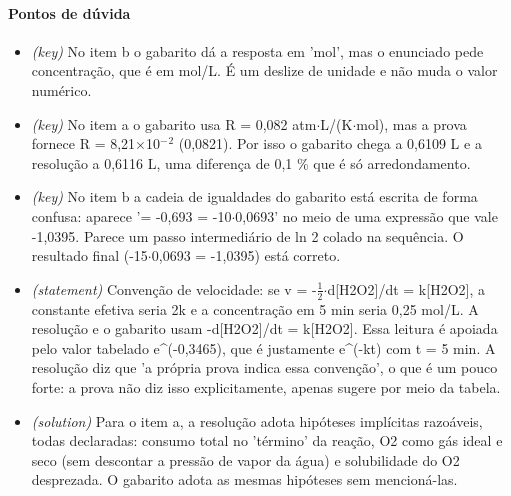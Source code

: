 \documentclass{article}%
\begin{document}
\paragraph{Pontos de dúvida}%
\begin{itemize}%
\item%
\textit{(key)} No item b o gabarito dá a resposta em 'mol', mas o enunciado pede concentração, que é em mol/L. É um deslize de unidade e não muda o valor numérico.%
\item%
\textit{(key)} No item a o gabarito usa R = 0,082 atm$\cdot$L/(K$\cdot$mol), mas a prova fornece R = 8,21$\times$10$^{-}$$^2$ (0,0821). Por isso o gabarito chega a 0,6109 L e a resolução a 0,6116 L, uma diferença de 0,1 \% que é só arredondamento.%
\item%
\textit{(key)} No item b a cadeia de igualdades do gabarito está escrita de forma confusa: aparece '= -0,693 = -10$\cdot$0,0693' no meio de uma expressão que vale -1,0395. Parece um passo intermediário de ln 2 colado na sequência. O resultado final (-15$\cdot$0,0693 = -1,0395) está correto.%
\item%
\textit{(statement)} Convenção de velocidade: se v = -$\frac12$$\cdot$d{[}H2O2{]}/dt = k{[}H2O2{]}, a constante efetiva seria 2k e a concentração em 5 min seria 0,25 mol/L. A resolução e o gabarito usam -d{[}H2O2{]}/dt = k{[}H2O2{]}. Essa leitura é apoiada pelo valor tabelado e\^{}(-0,3465), que é justamente e\^{}(-kt) com t = 5 min. A resolução diz que 'a própria prova indica essa convenção', o que é um pouco forte: a prova não diz isso explicitamente, apenas sugere por meio da tabela.%
\item%
\textit{(solution)} Para o item a, a resolução adota hipóteses implícitas razoáveis, todas declaradas: consumo total no 'término' da reação, O2 como gás ideal e seco (sem descontar a pressão de vapor da água) e solubilidade do O2 desprezada. O gabarito adota as mesmas hipóteses sem mencioná{-}las.%
\end{itemize}%
\end{document}
